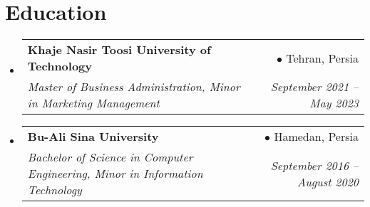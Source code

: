 \documentclass[letterpaper,11pt]{article}
\makeatletter
\newcommand{\resumeSubheading}[4]{
  \vspace{-2pt}\item
    \begin{tabular*}{0.97\textwidth}[t]{l@{\extracolsep{\fill}}r}
      \textbf{#1} & #2 \\
      \textit{\small#3} & \textit{\small #4} \\
    \end{tabular*}\vspace{-7pt}
}
\newcommand{\resumeSubHeadingListStart}{\begin{itemize}[leftmargin=0.15in, label={}]}
\newcommand{\resumeSubHeadingListEnd}{\end{itemize}}
\makeatother
\begin{document}
\section{Education}
  \resumeSubHeadingListStart
    \resumeSubheading
      {Khaje Nasir Toosi University of Technology}{$\bullet$ Tehran, Persia}
      {Master of Business Administration, Minor in Marketing Management}{September 2021 -- May 2023}
    \resumeSubheading
      {Bu-Ali Sina University}{$\bullet$ Hamedan, Persia}
      {Bachelor of Science in Computer Engineering, Minor in Information Technology}{September 2016 -- August 2020}
  \resumeSubHeadingListEnd

\end{document}
